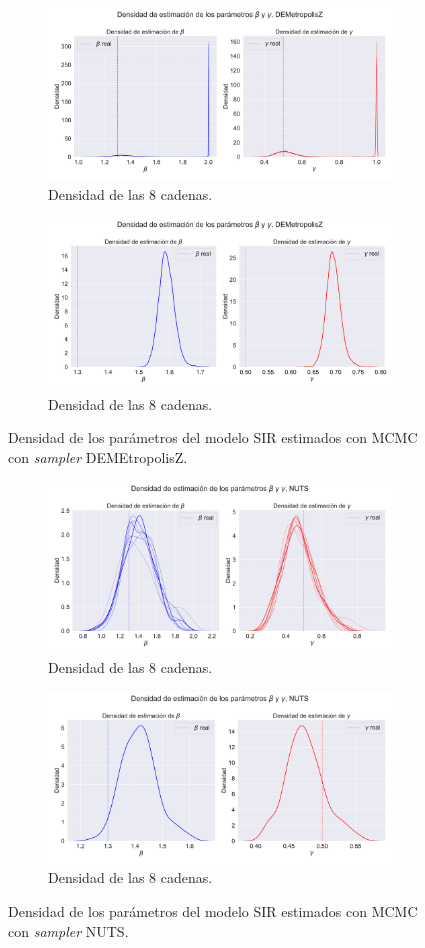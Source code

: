 \begin{figure}[h]
    \centering
    \begin{subfigure}[b]{\linewidth}
        \centering
        \includegraphics[width=0.55\linewidth]{img/content/chapter4/DEMetropolis_sir_params_density.pdf}
        \caption{Densidad de las 8 cadenas.}
    \end{subfigure}
     \begin{subfigure}[b]{\linewidth}
        \centering
        \includegraphics[width=0.55\linewidth]{img/content/chapter4/DEMetropolis_sir_params_density_mean.pdf}
        \caption{Densidad de las 8 cadenas.}
    \end{subfigure}
    \caption{Densidad de los parámetros del modelo SIR estimados con MCMC con \textit{sampler} DEMEtropolisZ.}
\end{figure}

\begin{figure}[h]
    \centering
    \begin{subfigure}[b]{\linewidth}
        \centering
        \includegraphics[width=0.55\linewidth]{img/content/chapter4/NUTS_sir_params_density.pdf}
        \caption{Densidad de las 8 cadenas.}
    \end{subfigure}
     \begin{subfigure}[b]{\linewidth}
        \centering
        \includegraphics[width=0.55\linewidth]{img/content/chapter4/NUTS_sir_params_density_mean.pdf}
        \caption{Densidad de las 8 cadenas.}
    \end{subfigure}
    \caption{Densidad de los parámetros del modelo SIR estimados con MCMC con \textit{sampler} NUTS.}
\end{figure}

